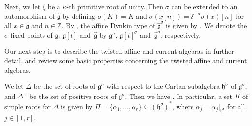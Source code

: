 \documentclass[10pt,a4paper]{amsart}
\numberwithin{equation}{section}
\begin{document}
Next, we let $\xi$ be a $\kappa$-th primitive root of unity. Then $\sigma$ can be extended to an automorphism of $\widehat{\mathfrak{g}}$ by defining $\sigma(K)=K$ and $\sigma(x[n])=\xi^{-n}\sigma(x)[n]$ for all $x\in\mathfrak{g}$ and $n\in\mathbb{Z}$. By \cite[Theorem~8.5]{Kac90}, the affine Dynkin type of $\widehat{\mathfrak{g}}^{\sigma}$ is given by . We denote the $\sigma$-fixed points of $\mathfrak{g}$, $\mathfrak{g}[t]$ and~$\widehat{\mathfrak{g}}$ by $\mathfrak{g}^{\sigma}$, $\mathfrak{g}[t]^{\sigma}$ and~$\widehat{\mathfrak{g}}^{\sigma}$, respectively.

Our next step is to describe the twisted affine and current algebras in further detail, and review some basic properties concerning the twisted affine and current algebras.

We let $\overline{\Delta}$ be the set of roots of $\mathfrak{g}^{\sigma}$ with respect to the Cartan subalgebra $\mathfrak{h}^{\sigma}$ of $\mathfrak{g}^{\sigma}$, and $\overline{\Delta}^+$ be the set of positive roots of $\mathfrak{g}^{\sigma}$. Then we have
.
In particular, a set $\overline{\Pi}$ of simple roots for $\overline{\Delta}$ is given by $\Pi=\{\overline{\alpha}_1,\dots,\overline{\alpha}_r\}\subseteq(\mathfrak{h}^{\sigma})^*$, where $\overline{\alpha}_j= \alpha_j|_{\mathfrak{h}^{\sigma}}$ for all $j\in[1,r]$.
\end{document}
